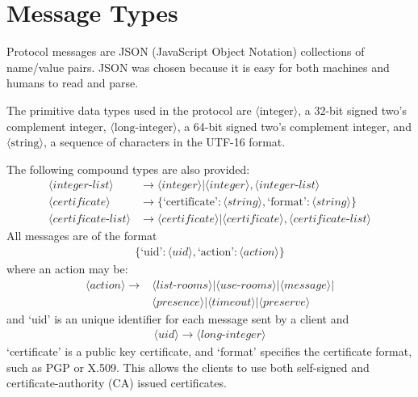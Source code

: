 \documentclass{article}
\begin{document}
\section{Message Types}

Protocol messages are JSON (JavaScript Object Notation) collections of
name/value pairs. JSON was chosen because it is easy for both machines and
humans to read and parse. 

The primitive data types used in the protocol are $\langle\text{integer}\rangle$, a 32-bit signed
two's complement integer, $\langle\text{long-integer}\rangle$, a 64-bit signed two's complement
integer, and $\langle\text{string}\rangle$, a sequence of characters in the UTF-16 format.

The following compound types are also provided:
\begin{align*}
\langle integer\text{-}list\rangle &\rightarrow \langle integer \rangle |
\langle integer \rangle , \langle integer\text{-}list \rangle \\
\langle certificate\rangle  &\rightarrow \{ \text{`certificate'} : \langle
string\rangle
, \text{`format'} : \langle string\rangle \} \\
\langle certificate\text{-}list\rangle &\rightarrow \langle certificate
\rangle | \langle certificate \rangle, \langle
certificate\text{-}list\rangle
\end{align*}
All messages are of the format 
\begin{align*}
\{\text{`uid'} : \langle uid\rangle, \text{`action'} : \langle action\rangle \}
\end{align*}
where an action may be:
\begin{align*}
\langle action \rangle\rightarrow&\langle list\text{-}rooms\rangle|\langle
use\text{-}rooms \rangle|\langle message\rangle| \\
&\langle presence\rangle|\langle timeout \rangle|\langle preserve\rangle 
\end{align*}
and `uid' is an unique identifier for each message sent by a client and 
\begin{align*}
\langle uid\rangle\rightarrow\langle long\text{-}integer\rangle
\end{align*}
`certificate' is a public key certificate, and `format' specifies the
certificate format, such as PGP or X.509. This allows the clients to use both
self-signed and certificate-authority (CA) issued certificates.
\end{document}
